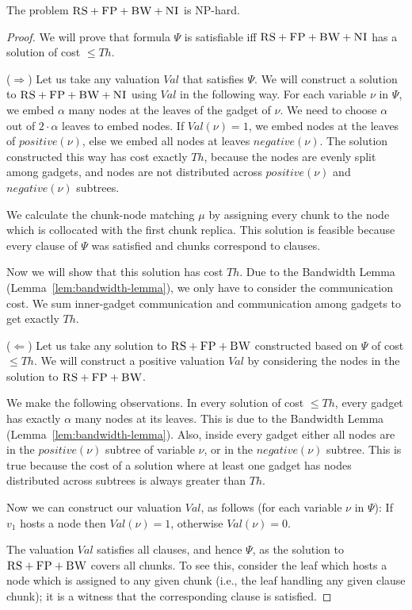 \documentclass[conference,10pt]{IEEEtran}
\newcommand{\variab}{\nu}
\newcommand{\clauses}{\alpha}
\newcommand{\CC}{\textsc{NI}}
\newcommand{\FP}{\textsc{FP}}
\newcommand{\RS}{\textsc{RS}}
\newcommand{\BW}{\textsc{BW}}
\newcommand{\Formula}{\ensuremath{\Psi}}
\newcommand{\Thr}{\ensuremath{Th}}
\newcommand{\positive}{\ensuremath{positive}}
\newcommand{\negative}{\ensuremath{negative}}
\newcommand{\Val}{\ensuremath{Val}}
\begin{document}
\begin{theorem}
The problem $\RS+\FP+\BW+\CC$ is NP-hard.
\label{theorem:3sat}
\end{theorem}
\begin{proof}
We will prove that formula $\Formula$ is satisfiable iff $\RS+\FP+\BW+\CC$ has
a solution of cost $\leq \Thr$.

($\Rightarrow$) Let us take any valuation $\Val$ that satisfies $\Formula$.
We will construct a solution to $\RS+\FP+\BW+\CC$ using $\Val$ in the following
way.
For each variable $\variab$ in $\Formula$, we embed $\clauses$ many nodes
at the  leaves of the gadget of $\variab$. We need to choose $\clauses$ out of
$2 \cdot \clauses$ leaves to embed nodes. If $\Val(\variab) = 1$, we embed
nodes at the leaves
of $\positive(\variab)$, else we embed all nodes at leaves $\negative(\variab)$.
The solution constructed this way has cost exactly
$\Thr$, because the nodes are evenly split among gadgets, and nodes are not
distributed across $\positive(\variab)$ and $\negative(\variab)$ subtrees.

We calculate the chunk-node matching $\mu$ by assigning every chunk to
the node which is collocated with the first chunk replica. This solution is feasible
because every clause of
$\Psi$ was satisfied and chunks correspond to clauses.

Now we will show that this solution has cost $\Thr$.
Due to the Bandwidth Lemma (Lemma~\ref{lem:bandwidth-lemma}),
we only have to consider the communication cost. We sum inner-gadget communication and communication among gadgets to get exactly $\Thr$.

($\Leftarrow$) Let us take any solution to $\RS+\FP+\BW$ constructed based on $\Formula$ of cost $\leq \Thr$.
We will construct a positive valuation $\Val$ by considering the nodes in
the solution to $\RS+\FP+\BW$.

We make the following observations. In every solution of cost
$\leq \Thr$, every gadget has exactly $\clauses$ many nodes
at its leaves. This is due to the Bandwidth Lemma (Lemma~\ref{lem:bandwidth-lemma}).
Also, inside
every gadget either all nodes are in the $\positive(\variab)$ subtree
of variable $\variab$, or in the $\negative(\variab)$ subtree. This is true
because the cost of a solution where at least one gadget has nodes
distributed across subtrees is
always greater than $\Thr$.

Now we can construct our valuation $\Val$, as follows
(for each variable $\variab$ in $\Formula$):
If $v_1$ hosts a node then $\Val(\variab) = 1$,
otherwise $\Val(\variab) = 0$.

The valuation $\Val$ satisfies all clauses, and hence $\Formula$,
as the solution to $\RS+\FP+\BW$ covers all chunks. To see this,
consider the leaf which
hosts a node which is assigned to any given chunk (i.e.,
the leaf handling any given clause chunk);
it is a witness that the corresponding clause is satisfied.
\end{proof}
\end{document}
